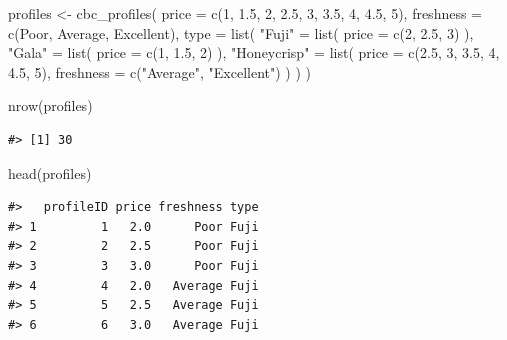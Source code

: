 \documentclass[
  12pt,
]{article}
\newenvironment{Shaded}{\begin{snugshade}}{\end{snugshade}}
\newcommand{\AttributeTok}[1]{\textcolor[rgb]{0.77,0.63,0.00}{#1}}
\newcommand{\DecValTok}[1]{\textcolor[rgb]{0.00,0.00,0.81}{#1}}
\newcommand{\FloatTok}[1]{\textcolor[rgb]{0.00,0.00,0.81}{#1}}
\newcommand{\FunctionTok}[1]{\textcolor[rgb]{0.00,0.00,0.00}{#1}}
\newcommand{\NormalTok}[1]{#1}
\newcommand{\OtherTok}[1]{\textcolor[rgb]{0.56,0.35,0.01}{#1}}
\newcommand{\StringTok}[1]{\textcolor[rgb]{0.31,0.60,0.02}{#1}}
\begin{document}
\begin{Shaded}
\begin{Highlighting}[]
\NormalTok{profiles }\OtherTok{\textless{}{-}} \FunctionTok{cbc\_profiles}\NormalTok{(}
  \AttributeTok{price =} \FunctionTok{c}\NormalTok{(}\DecValTok{1}\NormalTok{, }\FloatTok{1.5}\NormalTok{, }\DecValTok{2}\NormalTok{, }\FloatTok{2.5}\NormalTok{, }\DecValTok{3}\NormalTok{, }\FloatTok{3.5}\NormalTok{, }\DecValTok{4}\NormalTok{, }\FloatTok{4.5}\NormalTok{, }\DecValTok{5}\NormalTok{),}
  \AttributeTok{freshness =} \FunctionTok{c}\NormalTok{(}\StringTok{\textquotesingle{}Poor\textquotesingle{}}\NormalTok{, }\StringTok{\textquotesingle{}Average\textquotesingle{}}\NormalTok{, }\StringTok{\textquotesingle{}Excellent\textquotesingle{}}\NormalTok{),}
  \AttributeTok{type =} \FunctionTok{list}\NormalTok{(}
    \StringTok{"Fuji"} \OtherTok{=} \FunctionTok{list}\NormalTok{(}
        \AttributeTok{price =} \FunctionTok{c}\NormalTok{(}\DecValTok{2}\NormalTok{, }\FloatTok{2.5}\NormalTok{, }\DecValTok{3}\NormalTok{)}
\NormalTok{    ),}
    \StringTok{"Gala"} \OtherTok{=} \FunctionTok{list}\NormalTok{(}
        \AttributeTok{price =} \FunctionTok{c}\NormalTok{(}\DecValTok{1}\NormalTok{, }\FloatTok{1.5}\NormalTok{, }\DecValTok{2}\NormalTok{)}
\NormalTok{    ),}
    \StringTok{"Honeycrisp"} \OtherTok{=} \FunctionTok{list}\NormalTok{(}
        \AttributeTok{price =} \FunctionTok{c}\NormalTok{(}\FloatTok{2.5}\NormalTok{, }\DecValTok{3}\NormalTok{, }\FloatTok{3.5}\NormalTok{, }\DecValTok{4}\NormalTok{, }\FloatTok{4.5}\NormalTok{, }\DecValTok{5}\NormalTok{),}
        \AttributeTok{freshness =} \FunctionTok{c}\NormalTok{(}\StringTok{"Average"}\NormalTok{, }\StringTok{"Excellent"}\NormalTok{)}
\NormalTok{    )}
\NormalTok{  )}
\NormalTok{)}

\FunctionTok{nrow}\NormalTok{(profiles)}
\end{Highlighting}
\end{Shaded}

\begin{verbatim}
#> [1] 30
\end{verbatim}

\begin{Shaded}
\begin{Highlighting}[]
\FunctionTok{head}\NormalTok{(profiles)}
\end{Highlighting}
\end{Shaded}

\begin{verbatim}
#>   profileID price freshness type
#> 1         1   2.0      Poor Fuji
#> 2         2   2.5      Poor Fuji
#> 3         3   3.0      Poor Fuji
#> 4         4   2.0   Average Fuji
#> 5         5   2.5   Average Fuji
#> 6         6   3.0   Average Fuji
\end{verbatim}
\end{document}
